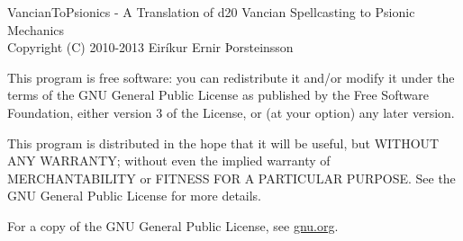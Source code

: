 VancianToPsionics - A Translation of d20 Vancian Spellcasting to Psionic Mechanics\\
Copyright (C) 2010-2013 Eiríkur Ernir Þorsteinsson

This program is free software: you can redistribute it and/or modify
it under the terms of the GNU General Public License as published by
the Free Software Foundation, either version 3 of the License, or
(at your option) any later version.

This program is distributed in the hope that it will be useful,
but WITHOUT ANY WARRANTY; without even the implied warranty of
MERCHANTABILITY or FITNESS FOR A PARTICULAR PURPOSE.  See the
GNU General Public License for more details.

For a copy of the GNU General Public License, see \href{http://www.gnu.org/licenses/}{gnu.org}.